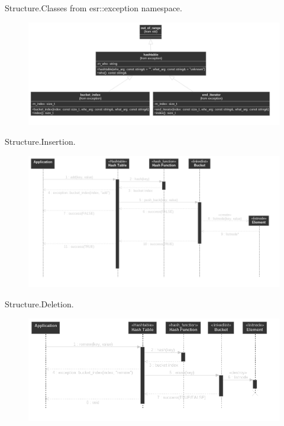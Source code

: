 \documentclass{beamer}
\begin{document}
\begin{frame}{Structure.}{Classes from esr::exception namespace.}
  \begin{figure}
    \includegraphics[scale=0.3]{structure_exceptions_classes}
  \end{figure}
\end{frame}


\begin{frame}{Structure.}{Insertion.}
  \begin{figure}
    \includegraphics[scale=0.3]{structure_insertion_sequence}
  \end{figure}
\end{frame}

\begin{frame}{Structure.}{Deletion.}
  \begin{figure}
    \includegraphics[scale=0.3]{structure_deletion_sequence}
  \end{figure}
\end{frame}
\end{document}

